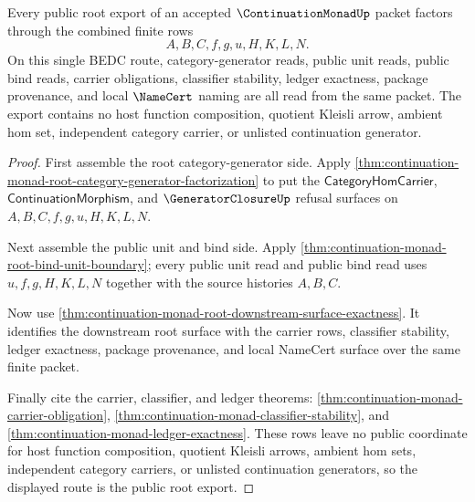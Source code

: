 \begin{theorem}
\label{thm:continuation-monad-root-public-export}
Every public root export of an accepted $\ContinuationMonadUp$ packet factors
through the combined finite rows
$$
A,B,C,f,g,u,H,K,L,N.
$$
On this single BEDC route, category-generator reads, public unit reads, public
bind reads, carrier obligations, classifier stability, ledger exactness,
package provenance, and local $\NameCert$ naming are all read from the same
packet. The export contains no host function composition, quotient Kleisli
arrow, ambient hom set, independent category carrier, or unlisted continuation
generator.
\end{theorem}
\begin{proof}
First assemble the root category-generator side. Apply
\autoref{thm:continuation-monad-root-category-generator-factorization} to put
the $\mathsf{CategoryHomCarrier}$, $\mathsf{ContinuationMorphism}$, and
$\GeneratorClosureUp$ refusal surfaces on $A,B,C,f,g,u,H,K,L,N$.

Next assemble the public unit and bind side. Apply
\autoref{thm:continuation-monad-root-bind-unit-boundary}; every public unit
read and public bind read uses $u,f,g,H,K,L,N$ together with the source
histories $A,B,C$.

Now use \autoref{thm:continuation-monad-root-downstream-surface-exactness}.
It identifies the downstream root surface with the carrier rows, classifier
stability, ledger exactness, package provenance, and local NameCert surface
over the same finite packet.

Finally cite the carrier, classifier, and ledger theorems:
\autoref{thm:continuation-monad-carrier-obligation},
\autoref{thm:continuation-monad-classifier-stability}, and
\autoref{thm:continuation-monad-ledger-exactness}. These rows leave no public
coordinate for host function composition, quotient Kleisli arrows, ambient hom
sets, independent category carriers, or unlisted continuation generators, so
the displayed route is the public root export.
\end{proof}

